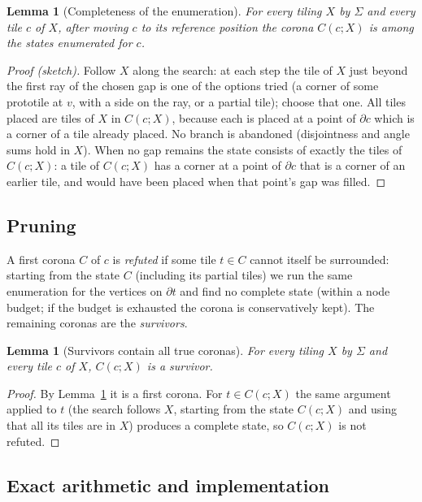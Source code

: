\documentclass[11pt]{article}
\newtheorem{lemma}[theorem]{Lemma}
\theoremstyle{remark}
\begin{document}
\begin{lemma}[Completeness of the enumeration]\label{lem:complete}
For every tiling $X$ by $\Sigma$ and every tile $c$ of $X$, after moving $c$ to its reference position the corona $C(c;X)$ is among the states enumerated for $c$.
\end{lemma}
\begin{proof}[Proof (sketch)]
Follow $X$ along the search: at each step the tile of $X$ just beyond the first ray of the chosen gap is one of the options tried (a corner of some prototile at $v$, with a side on the ray, or a partial tile); choose that one. All tiles placed are tiles of $X$ in $C(c;X)$, because each is placed at a point of $\partial c$ which is a corner of a tile already placed. No branch is abandoned (disjointness and angle sums hold in $X$). When no gap remains the state consists of exactly the tiles of $C(c;X)$: a tile of $C(c;X)$ has a corner at a point of $\partial c$ that is a corner of an earlier tile, and would have been placed when that point's gap was filled. \qedhere
\end{proof}

\subsection{Pruning}

A first corona $C$ of $c$ is \emph{refuted} if some tile $t\in C$ cannot itself be surrounded: starting from the state $C$ (including its partial tiles) we run the same enumeration for the vertices on $\partial t$ and find no complete state (within a node budget; if the budget is exhausted the corona is conservatively kept). The remaining coronas are the \emph{survivors}.

\begin{lemma}[Survivors contain all true coronas]\label{lem:sound}
For every tiling $X$ by $\Sigma$ and every tile $c$ of $X$, $C(c;X)$ is a survivor.
\end{lemma}
\begin{proof}
By Lemma~\ref{lem:complete} it is a first corona. For $t\in C(c;X)$ the same argument applied to $t$ (the search follows $X$, starting from the state $C(c;X)$ and using that all its tiles are in $X$) produces a complete state, so $C(c;X)$ is not refuted. \qedhere
\end{proof}

\subsection{Exact arithmetic and implementation}
\end{document}
